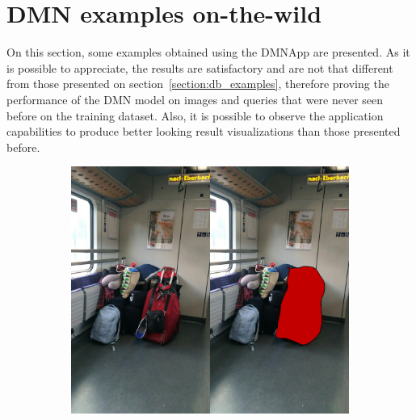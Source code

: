 \FloatBarrier
\section{DMN examples on-the-wild}
On this section, some examples obtained using the DMNApp are presented. As it is possible to appreciate, the results are satisfactory and are not that different from those presented on section~\ref{section:db_examples}, therefore proving the performance of the DMN model on images and queries that were never seen before on the training dataset. Also, it is possible to observe the application capabilities to produce better looking result visualizations than those presented before.

\begin{figure}[!htbp]
    \centering
    \begin{multicols}{2}
    \begin{subfigure}[b]{\columnwidth}
            \centering
            \includegraphics[width=\textwidth]{./figures/dmn_app/samples/3.jpg}
    \end{subfigure}
    

\end{multicols}
\end{figure}
